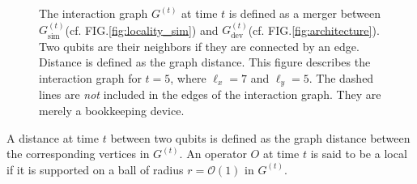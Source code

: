 \documentclass[prx,aps,amsmath,amssymb,floatfix,superscriptaddress,11pt,tightenlines,longbibliography,onecolumn,notitlepage]{revtex4-1}
\begin{document}
\begin{figure}[h]
  \caption{The interaction graph $G^{(t)}$ at time $t$ is defined as a merger between $G_{\text{sim}}^{(t)}$(cf. FIG.\ref{fig:locality_sim}) and $G_{\text{dev}}^{(t)}$(cf. FIG.\ref{fig:architecture}). Two qubits are their neighbors if they are connected by an edge. Distance is defined as the graph distance. This figure describes the interaction graph for $t=5$, where $\ell_x=7$ and $\ell_y=5$. The dashed lines are \emph{not} included in the edges of the interaction graph. They are merely a bookkeeping device.\label{fig:locality}}
\end{figure}

A distance at time $t$ between two qubits is defined as the graph distance between the corresponding vertices in $G^{(t)}$. An operator $O$ at time $t$ is said to be a local if it is supported on a ball of radius $r=\mathcal{O}(1)$ in $G^{(t)}$.
\end{document}
